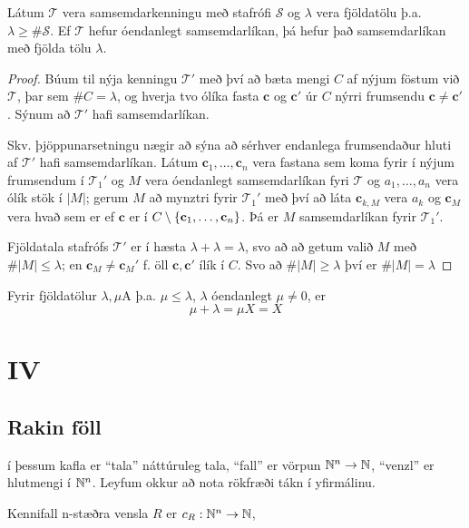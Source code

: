 \documentclass[12pt]{book}
\newcommand{\cT}{\mathcal{T}}
\newcommand{\mc}[1]{\mathcal{#1}}
\newcommand{\bc}{\mathbf{c}}
\begin{document}
\begin{setn}[Tarski]
  Látum $\cT$ vera samsemdarkenningu með stafrófi $\mc{S}$ 
  og $\lambda$  vera fjöldatölu þ.a. $\lambda \geq \# \mc{S}$.
  Ef $\cT$ hefur óendanlegt samsemdarlíkan, þá hefur það samsemdarlíkan með fjölda
  tölu $\lambda$.
\end{setn}

\begin{proof}
  Búum til nýja kenningu $\cT'$ með því að bæta mengi $C$ af nýjum
  föstum við $\cT$, þar sem $\# C = \lambda$, og hverja tvo ólíka
  fasta $\bc$ og $\bc'$ úr $C$ nýrri frumsendu $\bc \neq \bc'$.
  Sýnum að $\cT'$ hafi samsemdarlíkan.

  Skv. þjöppunarsetningu nægir að sýna að sérhver endanlega frumsendaður
  hluti af $\cT'$ hafi samsemdarlíkan. Látum $\bc_1, \dotsc, \bc_n$ vera
  fastana sem koma fyrir í nýjum
  frumsendum í $\cT_1'$ og $M$ vera óendanlegt samsemdarlíkan fyri $\cT$
  og $a_1, \dotsc, a_n$ 
vera ólík stök í $|M|$; gerum $M$ að mynztri fyrir $\cT_1'$ með því að láta
  $\bc_{k,M}$ vera $a_k$ og $\bc_M$ vera hvað sem er ef $\bc$ er í
  $C \setminus \set{\bc_1, \dotsc, \bc_n}$. Þá er $M$ samsemdarlíkan fyrir
  $\cT_1'$.

  Fjöldatala stafrófs $\cT'$ er í hæsta $\lambda + \lambda = \lambda$,
  svo að að getum valið $M$ með $\# |M| \leq \lambda$; en
  $\bc_M \neq \bc_M'$ f. öll $\bc, \bc'$ ílík í $C$. Svo að 
  $\# |M| \geq \lambda$ því er $\# |M| = \lambda$
  
  
\end{proof}

\begin{ath}
  Fyrir fjöldatölur $\lambda, \mu$A þ.a. $\mu \leq \lambda$, $\lambda$ óendanlegt
  $\mu \neq 0$, er 
  \[ \mu + \lambda = \mu X = X \]
\end{ath}


\chapter{IV}


\section{Rakin föll}

í þessum kafla er ``tala'' náttúruleg tala, ``fall'' er vörpun
$\mathbb{N}^{n} \to \mathbb{N}$, ``venzl'' er hlutmengi í $\mathbb{N}^{n}$. Leyfum okkur að nota
rökfræði tákn í yfirmálinu.

Kennifall n-stæðra vensla $R$ er 
$c_R: \mathbb{N}^n \to \mathbb{N}$,
\end{document}

